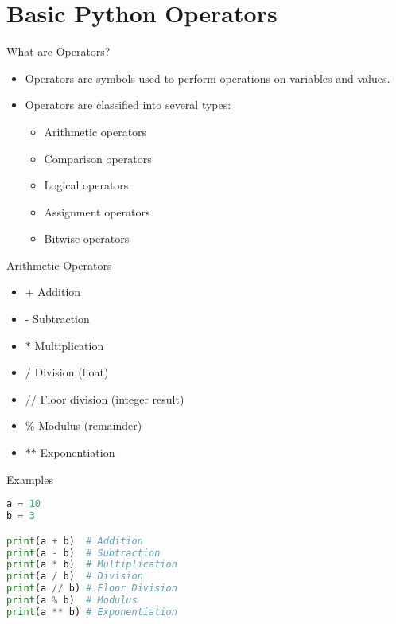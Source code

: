 \section{Basic Python Operators}
\begin{frame}[plain]
\sectionpage
\end{frame}

\begin{frame}{What are Operators?}
\begin{itemize}
    \item Operators are symbols used to perform operations on variables and values.
    \item Operators are classified into several types:
    \begin{itemize}
        \item Arithmetic operators
        \item Comparison operators
        \item Logical operators
        \item Assignment operators
        \item Bitwise operators
    \end{itemize}
\end{itemize}
\end{frame}

\begin{frame}{Arithmetic Operators}
\begin{itemize}
    \item \(\texttt{+}\) Addition
    \item \(\texttt{-}\) Subtraction
    \item \(\texttt{*}\) Multiplication
    \item \(\texttt{/}\) Division (float)
    \item \(\texttt{//}\) Floor division (integer result)
    \item \(\texttt{\%}\) Modulus (remainder)
    \item \(\texttt{**}\) Exponentiation
\end{itemize}
\end{frame}

\begin{frame}[fragile]{Examples}
\begin{lstlisting}[language=python]
a = 10
b = 3

print(a + b)  # Addition
print(a - b)  # Subtraction
print(a * b)  # Multiplication
print(a / b)  # Division
print(a // b) # Floor Division
print(a % b)  # Modulus
print(a ** b) # Exponentiation
\end{lstlisting}
\end{frame}

